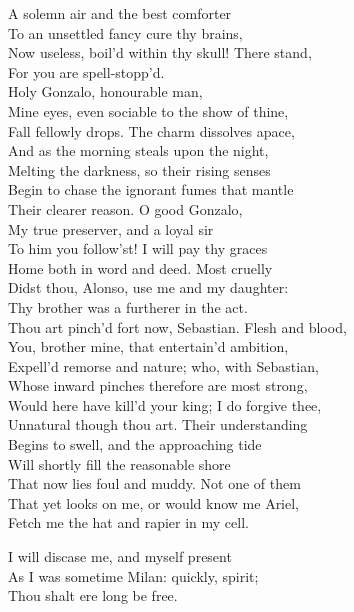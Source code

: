 \begin{verse_speech}[Prospero] 
A solemn air and the best comforter\\
To an unsettled fancy cure thy brains,\\
Now useless, boil'd within thy skull! There stand,\\
For you are spell-stopp'd.\\
Holy Gonzalo, honourable man,\\
Mine eyes, even sociable to the show of thine,\\
Fall fellowly drops. The charm dissolves apace,\\
And as the morning steals upon the night,\\
Melting the darkness, so their rising senses\\
Begin to chase the ignorant fumes that mantle\\
Their clearer reason. O good Gonzalo,\\
My true preserver, and a loyal sir\\
To him you follow'st! I will pay thy graces\\
Home both in word and deed. Most cruelly\\
Didst thou, Alonso, use me and my daughter:\\
Thy brother was a furtherer in the act.\\
Thou art pinch'd fort now, Sebastian. Flesh and blood,\\
You, brother mine, that entertain'd ambition,\\
Expell'd remorse and nature; who, with Sebastian,\\
Whose inward pinches therefore are most strong,\\
Would here have kill'd your king; I do forgive thee,\\
Unnatural though thou art. Their understanding\\
Begins to swell, and the approaching tide\\
Will shortly fill the reasonable shore\\
That now lies foul and muddy. Not one of them\\
That yet looks on me, or would know me Ariel,\\
Fetch me the hat and rapier in my cell.\\


I will discase me, and myself present\\
As I was sometime Milan: quickly, spirit;\\
Thou shalt ere long be free.
\end{verse_speech}

